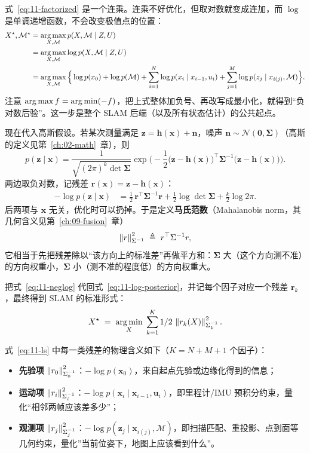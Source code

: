 式~\eqref{eq:11-factorized} 是一个连乘。连乘不好优化，但取对数就变成连加，而 $\log$ 是单调递增函数，不会改变极值点的位置：
\begin{align}
X^{\star},\mathcal{M}^{\star}
  &= \operatorname*{arg\,max}_{X,\mathcal{M}} p(X,\mathcal{M}\mid Z,U) \notag\\
  &= \operatorname*{arg\,max}_{X,\mathcal{M}} \log p(X,\mathcal{M}\mid Z,U) \notag\\
  &= \operatorname*{arg\,max}_{X,\mathcal{M}} \Big\{ \log p(x_0)+\log p(\mathcal{M})
     +\sum_{i=1}^{N}\log p(x_i\mid x_{i-1},u_i)
     +\sum_{j=1}^{M}\log p(z_j\mid x_{i(j)},\mathcal{M}) \Big\}.
\label{eq:11-log-posterior}
\end{align}
注意 $\operatorname*{arg\,max} f = \operatorname*{arg\,min}(-f)$，把上式整体加负号、再改写成最小化，就得到``负对数后验''。这一步是整个 SLAM 后端（以及所有状态估计）的公共起点。

现在代入高斯假设。若某次测量满足 $\bm{z}=\bm{h}(\bm{x})+\bm{n}$，噪声 $\bm{n}\sim\mathcal{N}(\bm{0},\bm{\Sigma})$（高斯的定义见第~\ref{ch:02-math}~章），则
\begin{equation}
p(\bm{z}\mid\bm{x})=\frac{1}{\sqrt{(2\pi)^k\det\bm{\Sigma}}}\exp\!\Big(-\frac12\big(\bm{z}-\bm{h}(\bm{x})\big)^{\top}\bm{\Sigma}^{-1}\big(\bm{z}-\bm{h}(\bm{x})\big)\Big).
\end{equation}
两边取负对数，记残差 $\bm{r}(\bm{x})=\bm{z}-\bm{h}(\bm{x})$：
\begin{align}
-\log p(\bm{z}\mid\bm{x})
  &= \frac12\,\bm{r}^{\top}\bm{\Sigma}^{-1}\bm{r}
   + \frac12\log\det\bm{\Sigma} + \frac{k}{2}\log 2\pi .
\label{eq:11-neglog}
\end{align}
后两项与 $\bm{x}$ 无关，优化时可以扔掉。于是定义\textbf{马氏范数}（Mahalanobis norm，其几何含义见第~\ref{ch:09-fusion}~章）
\begin{equation}
\left\lVert r \right\rVert_{\Sigma^{-1}}^{2} \;\triangleq\; r^{\top}\Sigma^{-1}r,
\end{equation}
它相当于先把残差除以``该方向上的标准差''再做平方和：$\bm{\Sigma}$ 大（这个方向测不准）的方向权重小，$\bm{\Sigma}$ 小（测不准的程度低）的方向权重大。

把式~\eqref{eq:11-neglog} 代回式~\eqref{eq:11-log-posterior}，并记每个因子对应一个残差 $\bm{r}_k$，最终得到 SLAM 的标准形式：
\begin{equation}
X^{\star} \;=\; \operatorname*{arg\,min}_{X}\;\sum_{k=1}^{K}1/2\,\left\lVert r_k(X) \right\rVert_{\Sigma_k^{-1}}^{2}.
\label{eq:11-ls}
\end{equation}

式~\eqref{eq:11-ls} 中每一类残差的物理含义如下（$K=N+M+1$ 个因子）：
\begin{itemize}
  \item \textbf{先验项} $\left\lVert r_0 \right\rVert_{\Sigma_0^{-1}}^2$：$-\log p(\bm{x}_0)$，来自起点先验或边缘化得到的信息；
  \item \textbf{运动项} $\left\lVert r_i \right\rVert_{\Sigma_i^{-1}}^2$：$-\log p(\bm{x}_i\mid\bm{x}_{i-1},\bm{u}_i)$，即里程计/IMU 预积分约束，量化``相邻两帧应该差多少''；
  \item \textbf{观测项} $\left\lVert r_j \right\rVert_{\Sigma_j^{-1}}^2$：$-\log p(\bm{z}_j\mid\bm{x}_{i(j)},\mathcal{M})$，即扫描匹配、重投影、点到面等几何约束，量化''当前位姿下，地图上应该看到什么''。
\end{itemize}

